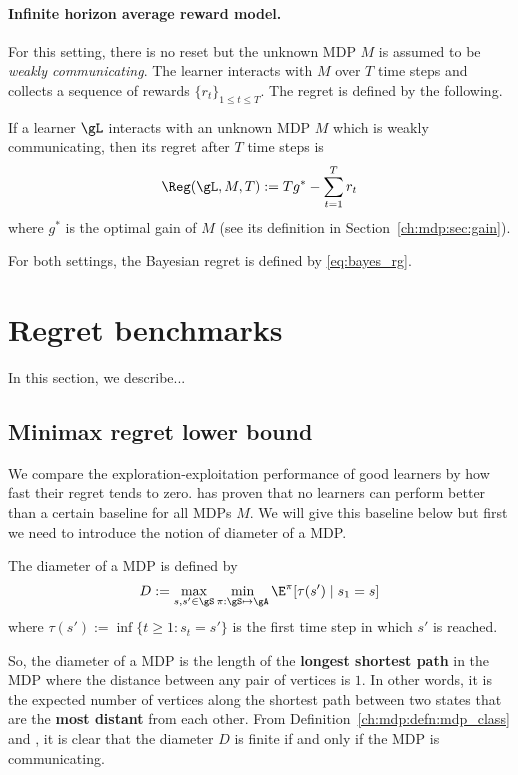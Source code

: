 \paragraph{Infinite horizon average reward model.}
For this setting, there is no reset but the unknown MDP $M$ is assumed to be \emph{weakly communicating}.
The learner interacts with $M$ over $T$ time steps and collects a sequence of rewards $\{r_t\}_{1\le t\le T}$.
The regret is defined by the following.
\begin{defn}
    \label{defn:rg_infinite}
    If a learner $\gL$ interacts with an unknown MDP $M$ which is weakly communicating, then its regret after $T$ time steps is
    \begin{equation}
        \label{eq:rg_finite}
        \Reg(\gL, M, T):= Tg^* -\sum_{t=1}^Tr_t
    \end{equation}
    where $g^*$ is the optimal gain of $M$ (see its definition in Section~\ref{ch:mdp:sec:gain}).
\end{defn}

For both settings, the Bayesian regret is defined by \eqref{eq:bayes_rg}.

\section{Regret benchmarks}
\label{sec:rg_benchmark}

In this section, we describe... 

\subsection{Minimax regret lower bound}

We compare the exploration-exploitation performance of good learners by how fast their regret tends to zero.
\cite{jaksch2010near} has proven that no learners can perform better than a certain baseline for all MDPs $M$.
We will give this baseline below but first we need to introduce the notion of diameter of a MDP.
\begin{defn}
    The diameter of a MDP is defined by
    \begin{equation}
        \label{eq:diameter}
        D := \max_{s,s'\in\gS}\min_{\pi:\gS\mapsto\gA} \E^\pi[\tau(s') \mid s_1=s]
    \end{equation}
    where $\tau(s'):=\inf\{t\ge1 : s_t=s'\}$ is the first time step in which $s'$ is reached.
\end{defn}
So, the diameter of a MDP is the length of the \textbf{longest shortest path} in the MDP where the distance between any pair of vertices is $1$.
In other words, it is the expected number of vertices along the shortest path between two states that are the \textbf{most distant} from each other.
From Definition~\ref{ch:mdp:defn:mdp_class} and \cite[Proposition~8.3.1]{puterman2014markov}, it is clear that the diameter $D$ is finite if and only if the MDP is communicating.

